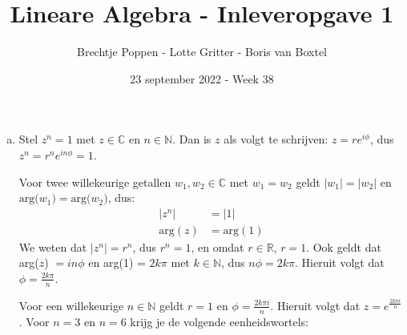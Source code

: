 \documentclass[12pt, a4paper]{article}
\begin{document}
\title{Lineare Algebra - Inleveropgave 1}
\author{Brechtje Poppen - Lotte Gritter - Boris van Boxtel}
\date{23 september 2022 - Week 38} 

\maketitle
{}

\begin{enumerate}[(a).]
    \item \label{opdrachta}
    Stel $z^n = 1$ met $z \in \mathbb{C}$ en $n \in \mathbb{N}$. Dan is $z$ als volgt te schrijven: $z = re^{i\phi}$, dus $z^n = r^ne^{in\phi} = 1$.

    Voor twee willekeurige getallen $w_1,w_2 \in \mathbb{C}$ met $w_1 = w_2$ geldt $|w_1|=|w_2|$ en  $\text{arg($w_1$)} = \text{arg($w_2$)}$, dus:
    \begin{equation}
        \begin{split}
            |z^n| &= |1| \\
            \text{arg}(z) &= \text{arg}(1)
        \end{split}
    \end{equation}
    We weten dat $|z^n| = r^n$, dus $r^n = 1$, en omdat $r \in \mathbb{R}$, $r = 1$. Ook geldt dat arg($z$) $= in\phi$ en arg(1) = $2k\pi$ met $k \in \mathbb{N}$, dus $n\phi = 2k\pi$. Hieruit volgt dat $\phi = \frac{2k\pi}{n}$.

    Voor een willekeurige $n \in \mathbb{N}$ geldt $r = 1$ en $\phi = \frac{2k\pi i}{n}$. Hieruit volgt dat $z = e^{\frac{2k\pi i}{n}}$. Voor $n = 3$ en $n = 6$ krijg je de volgende eenheidswortels:


\end{enumerate}
\end{document}
